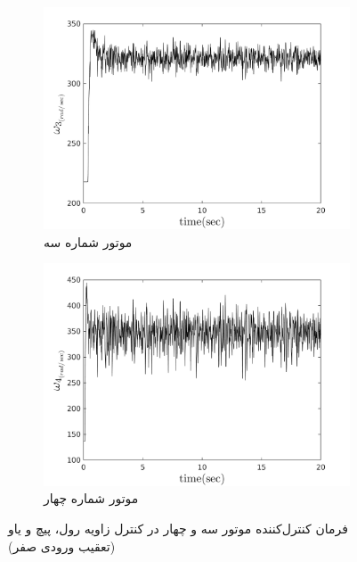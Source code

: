 \begin{figure}[H]
	\centering
	\begin{subfigure}[H]
		\centering
		\includegraphics[width=12cm]{../Figures/MIL/LQIDG/Roll_Pitch/lqidg_roll_pitch_Omega_3.png}
		\caption{موتور شماره سه}
	\end{subfigure}
	\begin{subfigure}[H]
		\centering
		\includegraphics[width=12cm]{../Figures/MIL/LQIDG/Roll_Pitch/lqidg_roll_pitch_Omega_4.png}
		\caption{موتور شماره چهار}
	\end{subfigure}
	\caption{‫‪فرمان کنترل‌کننده موتور سه و چهار در کنترل زاویه  رول، پیچ و یاو (تعقیب ورودی صفر)}
\end{figure}


